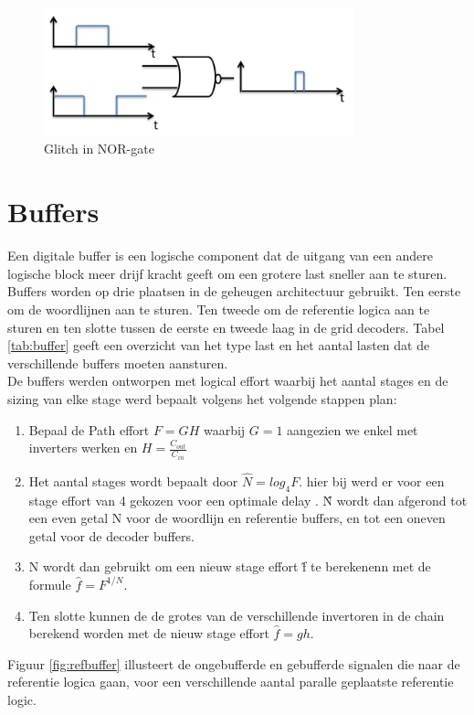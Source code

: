 \begin{figure}[!ht]
  \centering
  \includegraphics[width=0.8\textwidth]{../fig/hfdst-decoders-glitch.png}
  \caption{Glitch in NOR-gate}
  \label{fig:decoder_glitch}
\end{figure}


\section{Buffers}
Een digitale buffer is een logische component dat de uitgang van een andere logische block meer drijf kracht geeft om een grotere last sneller aan te sturen. Buffers worden op drie plaatsen in de geheugen architectuur gebruikt. Ten eerste om de woordlijnen aan te sturen. Ten tweede om de referentie logica aan te sturen en ten slotte  tussen de eerste en tweede laag in de grid decoders. Tabel \ref{tab:buffer} geeft een overzicht van het type last en het aantal lasten dat de verschillende buffers moeten aansturen.\\
De buffers werden ontworpen met logical effort waarbij het aantal stages en de sizing van elke stage werd bepaalt volgens het volgende stappen plan:
\begin{enumerate}
\item Bepaal de Path effort $F = GH$ waarbij $G = 1$ aangezien we enkel met inverters werken en $H = \frac{C_{out}}{C_{in}}$
\item Het aantal stages wordt bepaalt door $\hat{N} = log_{4}F$. hier bij werd er voor een stage effort van 4 gekozen voor een optimale delay \cite{Sutherland:1999:LED:298513}. \^{N} wordt dan afgerond tot een even getal N voor de woordlijn en referentie buffers, en tot een oneven getal voor de decoder buffers.
\item N wordt dan gebruikt om een nieuw stage effort \^{f} te berekenenn met de formule $\hat{f} = F^{1/N}$.
\item Ten slotte kunnen de de grotes van de verschillende invertoren in de chain berekend worden met de nieuw stage effort $\hat{f} = gh$.
\end{enumerate}
Figuur \ref{fig:refbuffer} illusteert de ongebufferde en gebufferde signalen die naar de referentie logica gaan, voor een verschillende aantal paralle geplaatste referentie logic.


